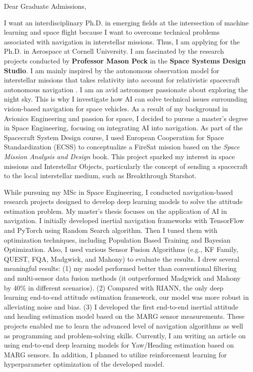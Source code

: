 \documentclass[a4,25pt]{article}
\begin{document}
\begin{large} 
Dear Graduate Admissions, \par
\vspace{-0.25cm}
\quad I want an interdisciplinary Ph.D. in emerging fields at the intersection of machine learning and space flight because I want to overcome technical problems associated with navigation in interstellar missions. Thus, I am applying for the Ph.D. in Aerospace at Cornell University. I am fascinated by the research projects conducted by \textbf{Professor Mason Peck} in the \textbf{Space Systems Design Studio}. I am mainly inspired by the autonomous observation model for interstellar missions that takes relativity into account for relativistic spacecraft autonomous navigation \cite{yucalan2021autonomous,yucalan2021optimal,yucalan2022autonomous}. I am an avid astronomer passionate about exploring the night sky. This is why I investigate how AI can solve technical issues surrounding vision-based navigation for space vehicles. As a result of my background in Avionics Engineering and passion for space, I decided to pursue a master's degree in Space Engineering, focusing on integrating AI into navigation. As part of the Spacecraft System Design course, I used European Cooperation for Space Standardization (ECSS) to conceptualize a FireSat mission based on the \textit{Space Mission Analysis and Design} book. This project sparked my interest in space missions and Interstellar Objects, particularly the concept of sending a spacecraft to the local interstellar medium, such as Breakthrough Starshot. \par
\vspace{-0.25cm}\quad 
While pursuing my MSc in Space Engineering, I conducted navigation-based research projects designed to develop deep learning models to solve the attitude estimation problem. My master's thesis focuses on the application of AI in navigation. I initially developed inertial navigation frameworks with TensorFlow and PyTorch using Random Search algorithm. Then I tuned them with optimization techniques, including Population Based Training and Bayesian Optimization. Also, I used various Sensor Fusion Algorithms (e.g., KF Family, QUEST, FQA, Madgwick, and Mahony) to evaluate the results. I drew several meaningful results: (1) my model performed better than conventional filtering and multi-sensor data fusion methods (it outperformed Madgwick and Mahony by 40\% in different scenarios). (2) Compared with RIANN, the only deep learning end-to-end attitude estimation framework, our model was more robust in alleviating noise and bias. (3) I developed the first end-to-end inertial attitude and heading estimation model based on the MARG sensor measurements. These projects enabled me to learn the advanced level of navigation algorithms as well as programming and problem-solving skills. Currently, I am writing an article on using end-to-end deep learning models for Yaw/Heading estimation based on MARG sensors. In addition, I planned to utilize reinforcement learning for hyperparameter optimization of the developed model. \par

\end{large}
\end{document}
